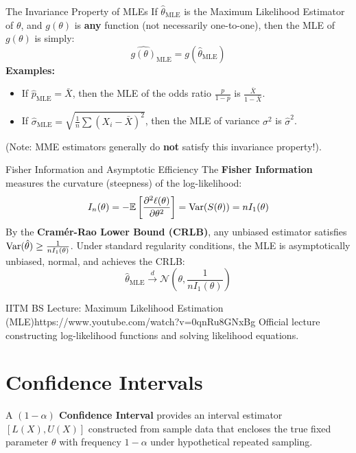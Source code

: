 \begin{theorembox}{The Invariance Property of MLEs}
If $\hat{\theta}_{\text{MLE}}$ is the Maximum Likelihood Estimator of $\theta$, and $g(\theta)$ is \textbf{any} function (not necessarily one-to-one), then the MLE of $g(\theta)$ is simply:
$$\widehat{g(\theta)}_{\text{MLE}} = g(\hat{\theta}_{\text{MLE}})$$
\textbf{Examples:}
\begin{itemize}
    \item If $\hat{p}_{\text{MLE}} = \bar{X}$, then the MLE of the odds ratio $\frac{p}{1-p}$ is $\frac{\bar{X}}{1 - \bar{X}}$.
    \item If $\hat{\sigma}_{\text{MLE}} = \sqrt{\frac{1}{n}\sum(X_i - \bar{X})^2}$, then the MLE of variance $\sigma^2$ is $\hat{\sigma}^2$.
\end{itemize}
(Note: MME estimators generally do \textbf{not} satisfy this invariance property!).
\end{theorembox}

\begin{theorembox}{Fisher Information and Asymptotic Efficiency}
The \textbf{Fisher Information} measures the curvature (steepness) of the log-likelihood:
$$I_n(\theta) = -\mathbb{E}\left[ \frac{\partial^2 \ell(\theta)}{\partial \theta^2} \right] = \operatorname{Var}(S(\theta)) = n I_1(\theta)$$
By the \textbf{Cramér-Rao Lower Bound (CRLB)}, any unbiased estimator satisfies $\operatorname{Var}(\hat{\theta}) \ge \frac{1}{n I_1(\theta)}$.
Under standard regularity conditions, the MLE is asymptotically unbiased, normal, and achieves the CRLB:
$$\hat{\theta}_{\text{MLE}} \xrightarrow{d} \mathcal{N}\left(\theta, \frac{1}{n I_1(\theta)}\right)$$
\end{theorembox}

\begin{videocard}{IITM BS Lecture: Maximum Likelihood Estimation (MLE)}{https://www.youtube.com/watch?v=0qnRu8GNxBg}
Official lecture constructing log-likelihood functions and solving likelihood equations.
\end{videocard}

\section{Confidence Intervals}

A \textbf{$(1-\alpha)$ Confidence Interval} provides an interval estimator $[L(X), U(X)]$ constructed from sample data that encloses the true fixed parameter $\theta$ with frequency $1 - \alpha$ under hypothetical repeated sampling.

